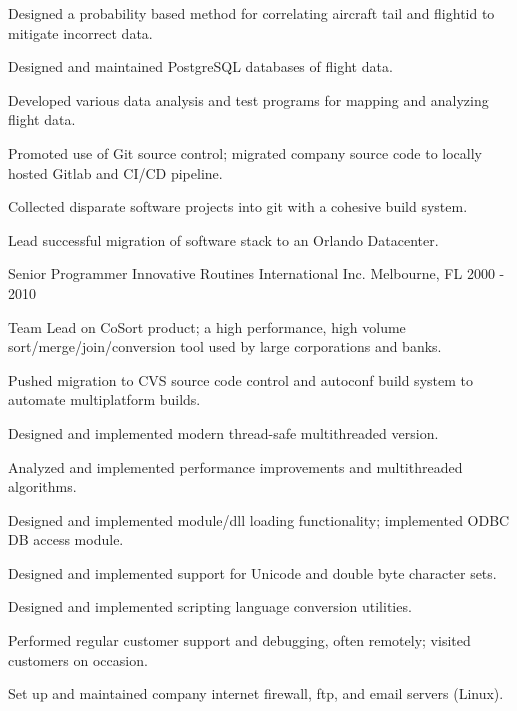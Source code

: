 \begin{cventries}
{\begin{cvitems}
        \item {Designed a probability based method for correlating aircraft tail and flightid to mitigate incorrect data.}
        \item {Designed and maintained PostgreSQL databases of flight data.}
        \item {Developed various data analysis and test programs for mapping and analyzing flight data.}
        \item {Promoted use of Git source control; migrated company source code to locally hosted Gitlab and CI/CD pipeline.}
        \item {Collected disparate software projects into git with a cohesive build system.}
        \item {Lead successful migration of software stack to an Orlando Datacenter.}
      \end{cvitems}
    }

  \cventry
    {Senior Programmer} %
    {Innovative Routines International Inc.} %
    {Melbourne, FL} %
    {2000 - 2010} %
    {
      \begin{cvitems} %
        \item {Team Lead on CoSort product; a high performance, high volume sort/merge/join/conversion tool used by large corporations and banks.}
        \item {Pushed migration to CVS source code control and autoconf build system to automate multiplatform builds.}
        \item {Designed and implemented modern thread-safe multithreaded version.}
        \item {Analyzed and implemented performance improvements and multithreaded algorithms.}
        \item {Designed and implemented module/dll loading functionality; implemented ODBC DB access module.}
        \item {Designed and implemented support for Unicode and double byte character sets.}
        \item {Designed and implemented scripting language conversion utilities.}
        \item {Performed regular customer support and debugging, often remotely; visited customers on occasion.}
        \item {Set up and maintained company internet firewall, ftp, and email servers (Linux).}
      \end{cvitems}
    }


\end{cventries}
